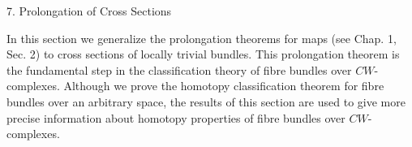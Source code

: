 7. Prolongation of Cross Sections

In this section we generalize the prolongation theorems for maps (see Chap. 1, Sec. 2) to cross sections of locally trivial bundles. This prolongation theorem is the fundamental step in the classification theory of fibre bundles over $CW$-complexes. Although we prove the homotopy classification theorem for fibre bundles over an arbitrary space, the results of this section are used to give more precise information about homotopy properties of fibre bundles over $CW$-complexes.
